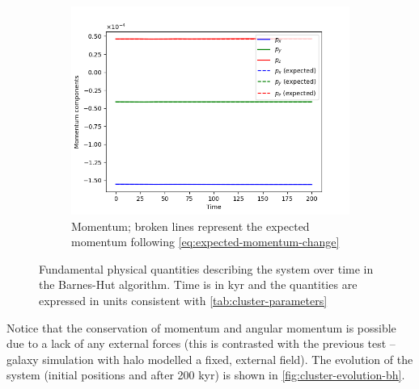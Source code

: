 \begin{figure}[htp]
    \vspace{0.5cm}

    \begin{subfigure}[b]{0.45\textwidth}
        \centering
        \includegraphics[width=\textwidth]{chapters/results/img/bh-cluster/momentum.png}
        \caption{Momentum; broken lines represent the expected momentum following \autoref{eq:expected-momentum-change}}
        \label{fig:physical-quantities-bh-cluster-sub3}
    \end{subfigure}

    \caption{Fundamental physical quantities describing the system over time in the Barnes-Hut algorithm.
        Time is in kyr and the quantities are expressed in units consistent with \autoref{tab:cluster-parameters}}
    \label{fig:physical-quantities-bh-cluster}
\end{figure}
Notice that the conservation of momentum and angular momentum is possible due to a lack of any external forces (this is contrasted with the previous test -- galaxy simulation with halo modelled a fixed, external field).
The evolution of the system (initial positions and after 200 kyr) is shown in \autoref{fig:cluster-evolution-bh}.
